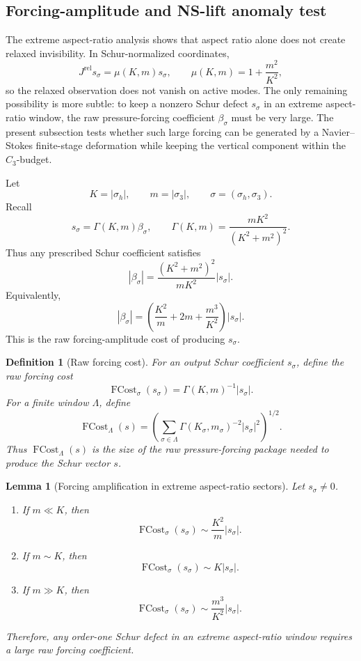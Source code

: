 \documentclass[11pt]{article}
\numberwithin{equation}{section}
\newtheorem{lemma}[theorem]{Lemma}
\newtheorem{definition}[theorem]{Definition}
\begin{document}
\subsection{Forcing-amplitude and NS-lift anomaly test}

The extreme aspect-ratio analysis shows that aspect ratio alone does not create relaxed invisibility. In Schur-normalized coordinates,
\[
J^{\mathrm{rel}}s_\sigma =
\mu(K,m)s_\sigma,
\qquad
\mu(K,m)=1+\frac{m^2}{K^2},
\]
so the relaxed observation does not vanish on active modes. The only remaining possibility is more subtle: to keep a nonzero Schur defect \(s_\sigma\) in an extreme aspect-ratio window, the raw pressure-forcing coefficient \(\beta_\sigma\) must be very large. The present subsection tests whether such large forcing can be generated by a Navier--Stokes finite-stage deformation while keeping the vertical component within the \(C_3\)-budget.

Let
\[
K=|\sigma_h|,
\qquad
m=|\sigma_3|,
\qquad
\sigma=(\sigma_h,\sigma_3).
\]
Recall
\[
s_\sigma=\Gamma(K,m)\beta_\sigma,
\qquad
\Gamma(K,m)=\frac{mK^2}{(K^2+m^2)^2}.
\]
Thus any prescribed Schur coefficient satisfies
\[
|\beta_\sigma| =
\frac{(K^2+m^2)^2}{mK^2}|s_\sigma|.
\]
Equivalently,
\[
|\beta_\sigma| =
\left(\frac{K^2}{m}+2m+\frac{m^3}{K^2}\right)|s_\sigma|.
\]
This is the raw forcing-amplitude cost of producing \(s_\sigma\).

\begin{definition}[Raw forcing cost]
For an output Schur coefficient \(s_\sigma\), define the raw forcing cost
\[
\operatorname{FCost}_{\sigma}(s_\sigma) =
\Gamma(K,m)^{-1}|s_\sigma|.
\]
For a finite window \(\Lambda\), define
\[
\operatorname{FCost}_{\Lambda}(s) =
\left(
\sum_{\sigma\in\Lambda}
\Gamma(K_\sigma,m_\sigma)^{-2}|s_\sigma|^2
\right)^{1/2}.
\]
Thus \(\operatorname{FCost}_\Lambda(s)\) is the size of the raw pressure-forcing package needed to produce the Schur vector \(s\).
\end{definition}

\begin{lemma}[Forcing amplification in extreme aspect-ratio sectors]
Let \(s_\sigma\neq0\).

\begin{enumerate}
\item If \(m\ll K\), then
\[
\operatorname{FCost}_{\sigma}(s_\sigma)
\sim
\frac{K^2}{m}|s_\sigma|.
\]

\item If \(m\sim K\), then
\[
\operatorname{FCost}_{\sigma}(s_\sigma)
\sim
K|s_\sigma|.
\]

\item If \(m\gg K\), then
\[
\operatorname{FCost}_{\sigma}(s_\sigma)
\sim
\frac{m^3}{K^2}|s_\sigma|.
\]
\end{enumerate}

Therefore, any order-one Schur defect in an extreme aspect-ratio window requires a large raw forcing coefficient.
\end{lemma}
\end{document}
